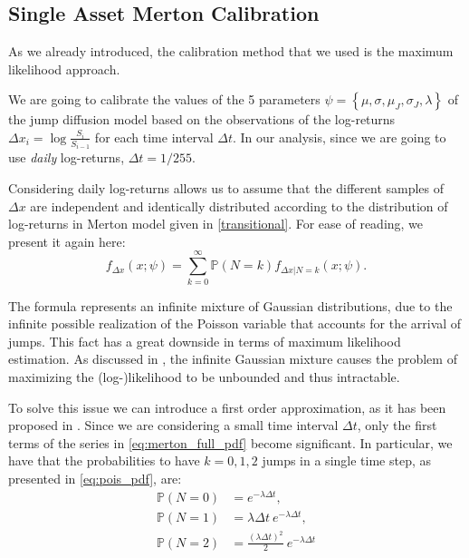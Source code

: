 \subsection{Single Asset Merton Calibration}
As we already introduced, the calibration method that we used is the maximum likelihood approach.

We are going to calibrate the values of the 5 parameters $\psi= \left\{ \mu, \sigma, \mu_J, \sigma_J, \lambda \right\}$ of the jump diffusion model based on the observations of the log-returns $\Delta x_i = \log \frac{S_i}{S_{i-1}}$ for each time interval $\Delta t$. In our analysis, since we are going to use \textit{daily} log-returns, $\Delta t = 1/255$. 

Considering daily log-returns allows us to assume that the different samples of $\Delta x$ are independent and identically distributed according to the distribution of log-returns in Merton model given in \eqref{transitional}.
For ease of reading, we present it again here:
\begin{equation}
\label{eq:merton_full_pdf}
f_{\Delta x } (x; \psi) = \sum_{k=0}^{\infty} \mathbb{P}(N = k) f_{\Delta x | N = k}(x ; \psi) .
\end{equation}

The formula represents an infinite mixture of Gaussian distributions, due to the infinite possible realization of the Poisson variable that accounts for the arrival of jumps. 
This fact has a great downside in terms of maximum likelihood estimation. As discussed in \citep{HONORE1998}, the infinite Gaussian mixture causes the problem of maximizing the (log-)likelihood to be unbounded and thus intractable.

To solve this issue we can introduce a first order approximation, as it has been proposed in \citep{BALLTOROUS1983}. 
Since we are considering a small time interval $\Delta t $, only the first terms of the series in \eqref{eq:merton_full_pdf} become significant. 
In particular, we have that the probabilities to have $k = 0, 1, 2$ jumps in a single time step, as presented in \eqref{eq:pois_pdf}, are:
\begin{subequations}
	\begin{align}
	\mathbb{P}(N = 0) &= e^{-\lambda \Delta t}, \\
	\mathbb{P}(N = 1) &= \lambda \Delta t \: e^{-\lambda \Delta t}, \\
	\mathbb{P}(N = 2) &= \frac{(\lambda \Delta t)^2}{2} \: e^{-\lambda \Delta t}
	\end{align}
\end{subequations}

